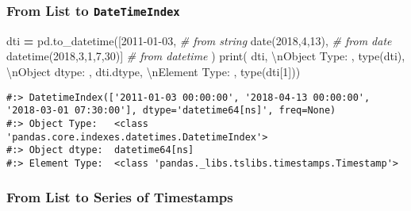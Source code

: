 \documentclass[
]{book}
\newenvironment{Shaded}{\begin{snugshade}}{\end{snugshade}}
\newcommand{\BuiltInTok}[1]{#1}
\newcommand{\CharTok}[1]{\textcolor[rgb]{0.5,0.5,0.5}{#1}}
\newcommand{\CommentTok}[1]{\textcolor[rgb]{0.37,0.37,0.37}{\textit{#1}}}
\newcommand{\DecValTok}[1]{\textcolor[rgb]{0.06,0.06,0.06}{#1}}
\newcommand{\NormalTok}[1]{#1}
\newcommand{\OperatorTok}[1]{\textcolor[rgb]{0.43,0.43,0.43}{\textbf{#1}}}
\newcommand{\StringTok}[1]{\textcolor[rgb]{0.5,0.5,0.5}{#1}}
\begin{document}
\hypertarget{from-list-to-datetimeindex}{%
\subsubsection{\texorpdfstring{From List to \texttt{DateTimeIndex}}{From List to DateTimeIndex}}\label{from-list-to-datetimeindex}}

\begin{Shaded}
\begin{Highlighting}[]
\NormalTok{dti }\OperatorTok{=}\NormalTok{ pd.to\_datetime([}\StringTok{\textquotesingle{}2011{-}01{-}03\textquotesingle{}}\NormalTok{,             }\CommentTok{\# from string}
\NormalTok{                       date(}\DecValTok{2018}\NormalTok{,}\DecValTok{4}\NormalTok{,}\DecValTok{13}\NormalTok{),         }\CommentTok{\# from date}
\NormalTok{                       datetime(}\DecValTok{2018}\NormalTok{,}\DecValTok{3}\NormalTok{,}\DecValTok{1}\NormalTok{,}\DecValTok{7}\NormalTok{,}\DecValTok{30}\NormalTok{)] }\CommentTok{\# from datetime}
\NormalTok{              )}
\BuiltInTok{print}\NormalTok{( dti,}
      \StringTok{\textquotesingle{}}\CharTok{\textbackslash{}n}\StringTok{Object Type:  \textquotesingle{}}\NormalTok{, }\BuiltInTok{type}\NormalTok{(dti),}
      \StringTok{\textquotesingle{}}\CharTok{\textbackslash{}n}\StringTok{Object dtype: \textquotesingle{}}\NormalTok{, dti.dtype,}
      \StringTok{\textquotesingle{}}\CharTok{\textbackslash{}n}\StringTok{Element Type: \textquotesingle{}}\NormalTok{, }\BuiltInTok{type}\NormalTok{(dti[}\DecValTok{1}\NormalTok{]))}
\end{Highlighting}
\end{Shaded}

\begin{verbatim}
#:> DatetimeIndex(['2011-01-03 00:00:00', '2018-04-13 00:00:00', '2018-03-01 07:30:00'], dtype='datetime64[ns]', freq=None) 
#:> Object Type:   <class 'pandas.core.indexes.datetimes.DatetimeIndex'> 
#:> Object dtype:  datetime64[ns] 
#:> Element Type:  <class 'pandas._libs.tslibs.timestamps.Timestamp'>
\end{verbatim}

\hypertarget{from-list-to-series-of-timestamps}{%
\subsubsection{From List to Series of Timestamps}\label{from-list-to-series-of-timestamps}}
\end{document}
